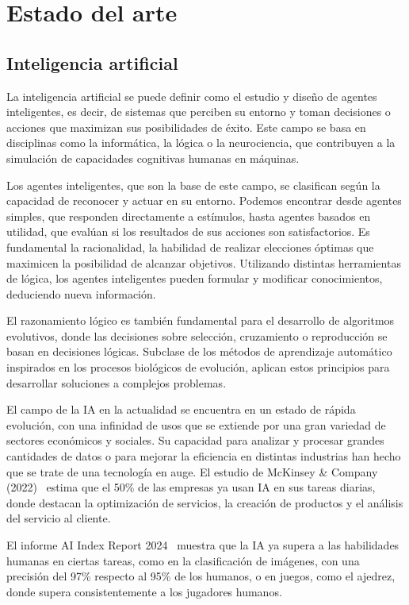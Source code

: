 \chapter{Estado del arte}
\label{ch:estado-arte}

\section{Inteligencia artificial}

La inteligencia artificial se puede definir como el estudio y diseño de agentes inteligentes, es decir, de sistemas que perciben su entorno y toman decisiones o acciones que maximizan sus posibilidades de éxito. Este campo se basa en disciplinas como la informática, la lógica o la neurociencia, que contribuyen a la simulación de capacidades cognitivas humanas en máquinas.

Los agentes inteligentes, que son la base de este campo, se clasifican según la capacidad de reconocer y actuar en su entorno. Podemos encontrar desde agentes simples, que responden directamente a estímulos, hasta agentes basados en utilidad, que evalúan si los resultados de sus acciones son satisfactorios. Es fundamental la racionalidad, la habilidad de realizar elecciones óptimas que maximicen la posibilidad de alcanzar objetivos. Utilizando distintas herramientas de lógica, los agentes inteligentes pueden formular y modificar conocimientos, deduciendo nueva información.

El razonamiento lógico es también fundamental para el desarrollo de algoritmos evolutivos, donde las decisiones sobre selección, cruzamiento o reproducción se basan en decisiones lógicas. Subclase de los métodos de aprendizaje automático inspirados en los procesos biológicos de evolución, aplican estos principios para desarrollar soluciones a complejos problemas.

El campo de la IA en la actualidad se encuentra en un estado de rápida evolución, con una infinidad de usos que se extiende por una gran variedad de sectores económicos y sociales. Su capacidad para analizar y procesar grandes cantidades de datos o para mejorar la eficiencia en distintas industrias han hecho que se trate de una tecnología en auge. El estudio de McKinsey \& Company (2022)~\cite{mckinsey2022ai} estima que el 50\% de las empresas ya usan IA en sus tareas diarias, donde destacan la optimización de servicios, la creación de productos y el análisis del servicio al cliente.

El informe AI Index Report 2024~\cite{AIIndex2024} muestra que la IA ya supera a las habilidades humanas en ciertas tareas, como en la clasificación de imágenes, con una precisión del 97\% respecto al 95\% de los humanos, o en juegos, como el ajedrez, donde supera consistentemente a los jugadores humanos.

